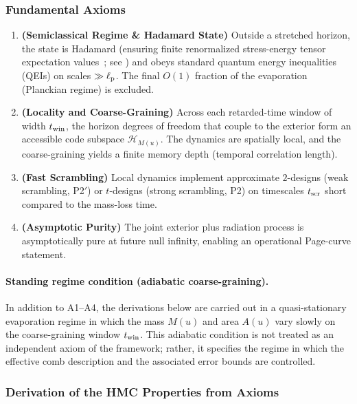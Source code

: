 \documentclass[a4paper,11pt]{article}
\newcommand{\HMC}{\textup{\textsc{HMC}}\xspace}
\theoremstyle{plain}
\theoremstyle{definition}
\theoremstyle{remark}
\begin{document}
\subsubsection{Fundamental Axioms}
\begin{enumerate}[label=\textbf{Axiom \arabic*}:]
  \item \textbf{(Semiclassical Regime \& Hadamard State)} Outside a stretched horizon, the state is Hadamard (ensuring finite renormalized stress-energy tensor expectation values~\cite{Radzikowski:1996}; see ) and obeys standard quantum energy inequalities (QEIs) on scales \(\gg \ell_{\rm p}\).
The final \(O(1)\) fraction of the evaporation (Planckian regime) is excluded.
  \item \textbf{(Locality and Coarse-Graining)} Across each retarded-time window of width $t_{\rm win}$, the horizon degrees of freedom that couple to the exterior form an accessible code subspace $\mathcal{H}_{M(u)}$. The dynamics are spatially local, and the coarse-graining yields a finite memory depth (temporal correlation length).
  \item \textbf{(Fast Scrambling)} Local dynamics implement approximate \(2\)-designs (weak scrambling, P2$'$) or \(t\)-designs (strong scrambling, P2) on timescales \(t_{\rm scr}\) short compared to the mass-loss time.
  \item \textbf{(Asymptotic Purity)} The joint exterior plus radiation process is asymptotically pure at future null infinity, enabling an operational Page-curve statement.
\end{enumerate}

\paragraph{Standing regime condition (adiabatic coarse-graining).}
In addition to A1--A4, the derivations below are carried out in a quasi-stationary evaporation regime in which the mass \(M(u)\) and area \(A(u)\) vary slowly on the coarse-graining window \(t_{\rm win}\). This adiabatic condition is not treated as an independent axiom of the framework; rather, it specifies the regime in which the effective comb description and the associated error bounds are controlled.

\subsubsection{Derivation of the \HMC{} Properties from Axioms}
\end{document}
